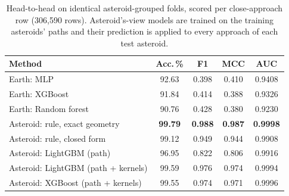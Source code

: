 \begin{table}[t]
\centering
\footnotesize
\caption{Head-to-head on identical asteroid-grouped folds, scored per close-approach row (306,590 rows). Asteroid's-view models are trained on the training asteroids' paths and their prediction is applied to every approach of each test asteroid.}
\label{tab:samefolds}
\setlength{\tabcolsep}{2.2pt}
\begin{tabular}{@{}lcccc@{}}
\toprule
Method & Acc.\,\% & F1 & MCC & AUC \\
\midrule
Earth: MLP & 92.63 & 0.398 & 0.410 & 0.9408 \\
Earth: XGBoost & 91.84 & 0.414 & 0.388 & 0.9326 \\
Earth: Random forest & 90.76 & 0.428 & 0.380 & 0.9230 \\
\midrule
Asteroid: rule, exact geometry & \textbf{99.79} & \textbf{0.988} & \textbf{0.987} & \textbf{0.9998} \\
Asteroid: rule, closed form & 99.12 & 0.949 & 0.944 & 0.9908 \\
Asteroid: LightGBM (path) & 96.95 & 0.822 & 0.806 & 0.9916 \\
Asteroid: LightGBM (path + kernels) & 99.59 & 0.976 & 0.974 & 0.9994 \\
Asteroid: XGBoost (path + kernels) & 99.55 & 0.974 & 0.971 & 0.9996 \\
\bottomrule
\end{tabular}
\end{table}
